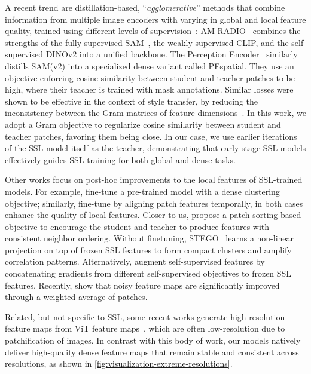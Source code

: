  
A recent trend are distillation-based, ``\emph{agglomerative}'' methods that combine information from multiple image encoders with varying in global and local feature quality, trained using different levels of supervision~\citep{ranzinger2024radio, bolya2025perception}: AM-RADIO~\citep{ranzinger2024radio} combines the strengths of the fully-supervised SAM~\citep{kirillov2023segment}, the weakly-supervised CLIP, and the self-supervised DINOv2 into a unified backbone.
The Perception Encoder~\citep{bolya2025perception} similarly distills SAM(v2) into a specialized dense variant called PEspatial. 
They use an objective enforcing cosine similarity between student and teacher patches to be high, where their teacher is trained with mask annotations. 
Similar losses were shown to be effective in the context of style transfer, by reducing the inconsistency between the Gram matrices of feature dimensions~\citep{gatys2016image,johnson2016perceptual,yoo2024sagagan}.
In this work, we adopt a Gram objective to regularize cosine similarity between student and teacher patches, favoring them being close. 
In our case, we use earlier iterations of the SSL model itself as the teacher, demonstrating that early-stage SSL models effectively guides SSL training for both global and dense tasks. 

Other works focus on post-hoc improvements to the local features of SSL-trained models.
For example, \citet{ziegler2022self} fine-tune a pre-trained model with a dense clustering objective; similarly, \citet{salehi2023time} fine-tune by aligning patch features temporally, in both cases enhance the quality of local features.
Closer to us, \citet{pariza2025near} propose a patch-sorting based objective to encourage the student and teacher to produce features with consistent neighbor ordering. 
Without finetuning, STEGO~\citep{hamilton2022unsupervised} learns a non-linear projection on top of frozen SSL features to form compact clusters and amplify correlation patterns. 
Alternatively, \citet{simoncini2024no} augment self-supervised features by concatenating gradients from different self-supervised objectives to frozen SSL features. 
Recently, \citet{wysoczanska2023clipdino} show that noisy feature maps are significantly improved through a weighted average of patches.    






Related, but not specific to SSL, some recent works generate high-resolution feature maps from ViT feature maps~\citep{fu2024featup}, which are often low-resolution due to patchification of images. %
In contrast with this body of work, our models natively deliver high-quality dense feature maps that remain stable and consistent across resolutions, as shown in \cref{fig:visualization-extreme-resolutions}.






